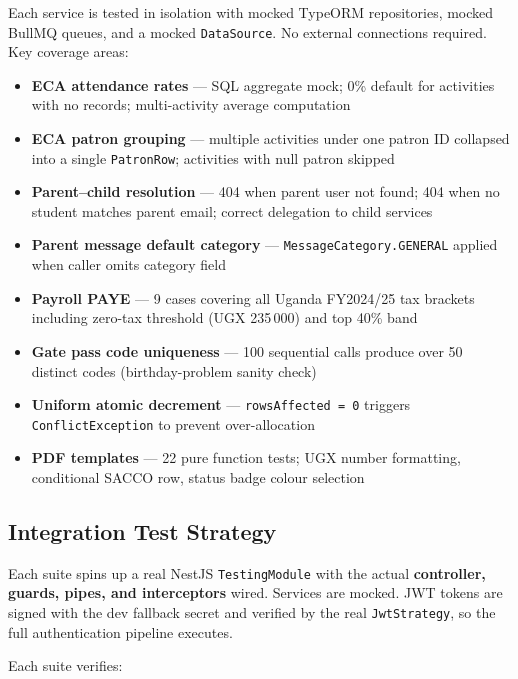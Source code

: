\documentclass[11pt, a4paper]{article}
\newcommand{\code}[1]{\texttt{\small #1}}
\begin{document}
Each service is tested in isolation with mocked TypeORM repositories,
mocked BullMQ queues, and a mocked \code{DataSource}. No external connections
required. Key coverage areas:

\begin{itemize}[leftmargin=1.5em, itemsep=2pt]
  \item \textbf{ECA attendance rates} --- SQL aggregate mock; 0\% default for
    activities with no records; multi-activity average computation
  \item \textbf{ECA patron grouping} --- multiple activities under one patron ID
    collapsed into a single \code{PatronRow}; activities with null patron skipped
  \item \textbf{Parent--child resolution} --- 404 when parent user not found;
    404 when no student matches parent email; correct delegation to child services
  \item \textbf{Parent message default category} --- \code{MessageCategory.GENERAL}
    applied when caller omits category field
  \item \textbf{Payroll PAYE} --- 9 cases covering all Uganda FY2024/25 tax
    brackets including zero-tax threshold (UGX 235\,000) and top 40\% band
  \item \textbf{Gate pass code uniqueness} --- 100 sequential calls produce
    over 50 distinct codes (birthday-problem sanity check)
  \item \textbf{Uniform atomic decrement} --- \code{rowsAffected = 0} triggers
    \code{ConflictException} to prevent over-allocation
  \item \textbf{PDF templates} --- 22 pure function tests; UGX number formatting,
    conditional SACCO row, status badge colour selection
\end{itemize}

\subsection{Integration Test Strategy}

Each suite spins up a real NestJS \code{TestingModule} with the actual
\textbf{controller, guards, pipes, and interceptors} wired. Services are mocked.
JWT tokens are signed with the dev fallback secret and verified by the real
\code{JwtStrategy}, so the full authentication pipeline executes.

Each suite verifies:
\end{document}
